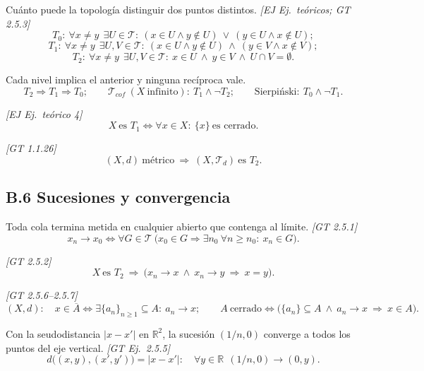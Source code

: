 \documentclass[11pt,a4paper]{article}
\theoremstyle{definition}
\theoremstyle{plain}
\newcommand{\fnt}[1]{{\normalfont\small\itshape\color{gray!150!black}[#1]}}
\newcommand{\R}{\mathbb{R}}
\newcommand{\cl}[1]{\overline{#1}}
\newcommand{\tp}{\mathcal{T}}
\begin{document}
\begin{itemize}[leftmargin=1.3em,itemsep=3pt]

 Cuánto puede la topología distinguir dos puntos distintos. \fnt{EJ Ej.\ teóricos; GT 2.5.3}
\[ T_0:\ \forall x\ne y\ \ \exists U\in\tp:\ (x\in U\wedge y\notin U)\ \vee\ (y\in U\wedge x\notin U); \]
\[ T_1:\ \forall x\ne y\ \ \exists U,V\in\tp:\ (x\in U\wedge y\notin U)\ \wedge\ (y\in V\wedge x\notin V); \]
\[ T_2:\ \forall x\ne y\ \ \exists U,V\in\tp:\ x\in U\ \wedge\ y\in V\ \wedge\ U\cap V=\emptyset. \]

 Cada nivel implica el anterior y ninguna recíproca vale.
\[ T_2\Rightarrow T_1\Rightarrow T_0;\qquad \tp_{cof}\ (X\ \text{infinito}):\ T_1\wedge\neg T_2;\qquad \text{Sierpi\'nski}:\ T_0\wedge\neg T_1. \]

 \fnt{EJ Ej.\ teórico 4}
\[ X\ \text{es } T_1\iff \forall x\in X:\ \{x\}\ \text{es cerrado}. \]

 \fnt{GT 1.1.26}
\[ (X,d)\ \text{métrico}\ \Rightarrow\ (X,\tp_d)\ \text{es } T_2. \]

\end{itemize}

\subsection*{B.6 Sucesiones y convergencia}

\begin{itemize}[leftmargin=1.3em,itemsep=3pt]

 Toda cola termina metida en cualquier abierto que contenga al límite. \fnt{GT 2.5.1}
\[ x_n\to x_0\iff \forall G\in\tp\ \big(x_0\in G\Rightarrow \exists n_0\ \forall n\ge n_0:\ x_n\in G\big). \]

 \fnt{GT 2.5.2}
\[ X\ \text{es } T_2\ \Rightarrow\ \big(x_n\to x\ \wedge\ x_n\to y\ \Rightarrow\ x=y\big). \]

 \fnt{GT 2.5.6--2.5.7}
\[ (X,d):\quad x\in\cl A\iff \exists\{a_n\}_{n\ge1}\subseteq A:\ a_n\to x;\qquad
A\ \text{cerrado}\iff \big(\{a_n\}\subseteq A\ \wedge\ a_n\to x\ \Rightarrow\ x\in A\big). \]

 Con la seudodistancia $|x-x'|$ en $\R^2$, la sucesión $(1/n,0)$ converge a todos los puntos del eje vertical. \fnt{GT Ej.\ 2.5.5}
\[ d\big((x,y),(x',y')\big)=|x-x'|:\quad \forall y\in\R\ \ (1/n,0)\to(0,y). \]

\end{itemize}
\end{document}
